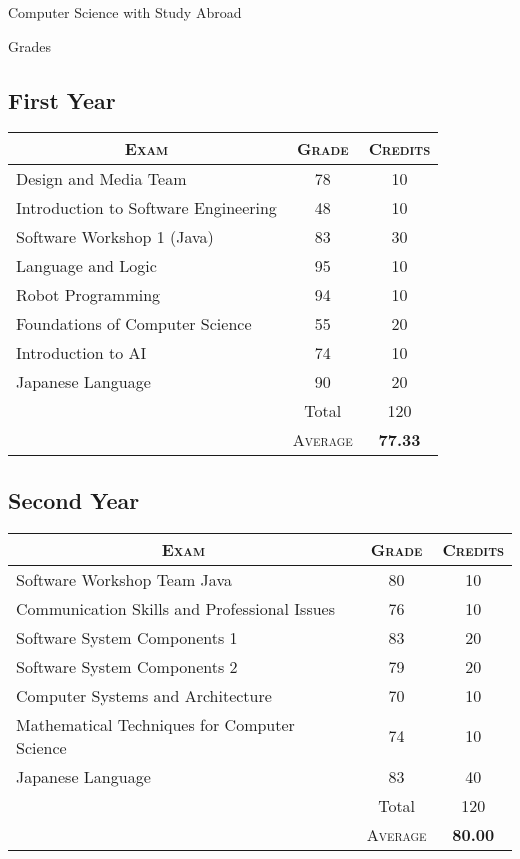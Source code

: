 \documentclass[a4paper,10pt]{article}
\begin{document}
\newpage
\par{\centering\Large \hypertarget{bham_ug}{Computer Science with
    Study Abroad}\par}\large{\centering Grades\par}\normalsize
\begin{center}
  \section{First Year}
  \begin{tabular}{lcc}
    \multicolumn{1}{c}{\textsc{Exam}}&\textsc{Grade}&\textsc{Credits}\\ \hline
    Design and Media Team&78&	10\\
    Introduction to Software Engineering	&48&	10\\
    Software Workshop 1 (Java)	&83&	30\\
    Language and Logic	&95&	10\\
    Robot Programming	&94&	10\\
    Foundations of Computer Science	&55	&20\\
    Introduction to AI	&74&	10\\
    Japanese Language	&90&	20\\\cline{2-3}
    & Total&120\\
    &\textsc{Average}&\textbf{77.33}
  \end{tabular}
\end{center}
\begin{center}
  \section{Second Year}
  \begin{tabular}{lcc}
    \multicolumn{1}{c}{\textsc{Exam}}&\textsc{Grade}&\textsc{Credits}\\ \hline
    Software Workshop Team Java&80&	10\\
    Communication Skills and Professional Issues	&76&	10\\
    Software System Components 1	&83&	20\\
    Software System Components 2	&79&	20\\
    Computer Systems and Architecture	&70&	10\\
    Mathematical Techniques for Computer Science	&74	&10\\
    Japanese Language	&83&	40\\\cline{2-3}
    & Total&120\\
    &\textsc{Average}&\textbf{80.00}
  \end{tabular}
\end{center}
\end{document}
